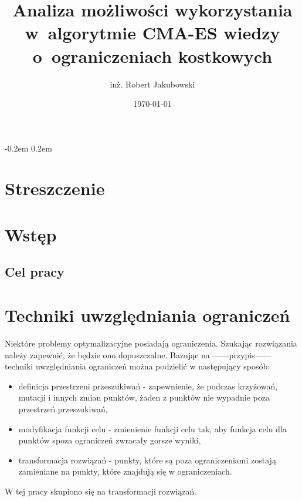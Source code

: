 \documentclass{mini}
\title{Analiza możliwości wykorzystania w~algorytmie CMA-ES wiedzy o~ograniczeniach kostkowych}
\author{inż. Robert Jakubowski}
\date{\today}
\begin{document}
\maketitle

\pagebreak
\thispagestyle{empty}

\openup -0.2em %
\tableofcontents 
\openup 0.2em %

\thispagestyle{empty}
\raggedbottom
\pagebreak


\section{Streszczenie}

\pagebreak

\section{Wstęp}

\subsection{Cel pracy}

\pagebreak

\section{Techniki uwzględniania ograniczeń}
Niektóre problemy optymalizacyjne posiadają ograniczenia. Szukając rozwiązania należy zapewnić, że będzie ono dopuszczalne. Bazując na ------przypis------ techniki uwzględniania ograniczeń można podzielić w następujący sposób:
\begin{itemize}[noitemsep]
\item definicja przestrzeni przeszukiwań - zapewnienie, że podczas krzyżowań, mutacji i innych zmian punktów, żaden z punktów nie wypadnie poza przestrzeń przeszukiwań,
\item modyfikacja funkcji celu - zmienienie funkcji celu tak, aby funkcja celu dla punktów spoza ograniczeń zwracały gorsze wyniki,
\item transformacja rozwiązań - punkty, które są poza ograniczeniami zostają zamieniane na punkty, które znajdują się w ograniczeniach.
\end{itemize}

W tej pracy skupiono się na transformacji rozwiązań.
\end{document}
